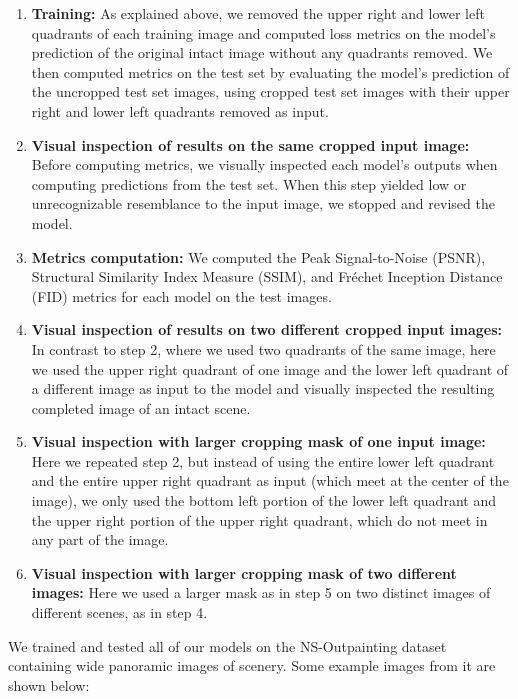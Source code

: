 \documentclass[sigconf]{acmart}
\begin{document}
\begin{enumerate}
    \item \textbf{Training:} As explained above, we removed the upper right and lower left quadrants of each training image and computed loss metrics on the model’s prediction of the original intact image without any quadrants removed. We then computed metrics on the test set by evaluating the model’s prediction of the uncropped test set images, using cropped test set images with their upper right and lower left quadrants removed as input.
    
    \item \textbf{Visual inspection of results on the same cropped input image:} Before computing metrics, we visually inspected each model’s outputs when computing predictions from the test set. When this step yielded low or unrecognizable resemblance to the input image, we stopped and revised the model.
    
    \item \textbf{Metrics computation:} We computed the Peak Signal-to-Noise (PSNR), Structural Similarity Index Measure (SSIM), and Fréchet Inception Distance (FID) metrics for each model on the test images.
    
    \item \textbf{Visual inspection of results on two different cropped input images:} In contrast to step 2, where we used two quadrants of the same image, here we used the upper right quadrant of one image and the lower left quadrant of a different image as input to the model and visually inspected the resulting completed image of an intact scene.
    
    \item \textbf{Visual inspection with larger cropping mask of one input image:} Here we repeated step 2, but instead of using the entire lower left quadrant and the entire upper right quadrant as input (which meet at the center of the image), we only used the bottom left portion of the lower left quadrant and the upper right portion of the upper right quadrant, which do not meet in any part of the image.
    
    \item \textbf{Visual inspection with larger cropping mask of two different images:} Here we used a larger mask as in step 5 on two distinct images of different scenes, as in step 4.
\end{enumerate}

We trained and tested all of our models on the NS-Outpainting dataset containing wide panoramic images of scenery. Some example images from it are shown below:
\end{document}
